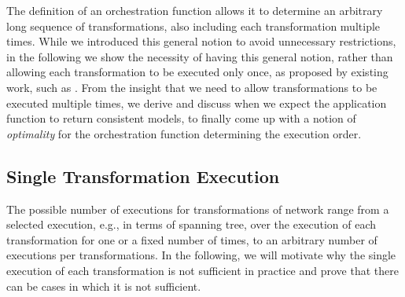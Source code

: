 The definition of an orchestration function allows it to determine an arbitrary long sequence of transformations, also including each transformation multiple times.
While we introduced this general notion to avoid unnecessary restrictions, in the following we show the necessity of having this general notion, rather than allowing each transformation to be executed only once, as proposed by existing work, such as \cite{stevens2020BidirectionalTransformationLarge-SoSym}.
From the insight that we need to allow transformations to be executed multiple times, we derive and discuss when we expect the application function to return consistent models, to finally come up with a notion of \emph{optimality} for the orchestration function determining the execution order.




\subsection{Single Transformation Execution}

The possible number of executions for transformations of network range from a selected execution, e.g., in terms of spanning tree, over the execution of each transformation for one or a fixed number of times, to an arbitrary number of executions per transformations.
In the following, we will motivate why the single execution of each transformation is not sufficient in practice and prove that there can be cases in which it is not sufficient.

